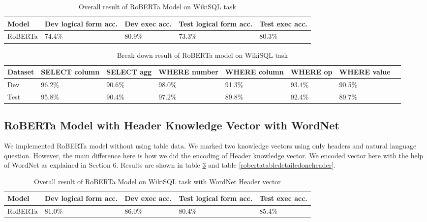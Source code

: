 \documentclass[12pt]{article}
\begin{document}
 \begin{table}
\centering
 \begin{tabular}{| m{2cm} | m{2cm}| m{2cm} |m{2cm}| m{2cm} |} 
 \hline
Model & Dev logical form acc. & Dev exec acc. & Test logical form acc. & Test exec acc. \\ 
 \hline\hline
  RoBERTa & 74.4\% & 80.9\% & 73.3\% & 80.3\% \\ 
 \hline
\end{tabular}
\caption{Overall result of RoBERTa Model on WikiSQL task}
\label{robertatable}
\end{table}


\begin{table}
\centering
 \begin{tabular}{| m{2cm} | m{2cm}| m{2cm} |m{2cm}| m{2cm} |m{2cm} | m{2cm} |m{2cm} |} 
 \hline
  Dataset & SELECT column & SELECT agg & WHERE number & WHERE column & WHERE op & WHERE value\\ 
 \hline\hline
  Dev & 96.2\% & 90.6\% & 98.0\% & 91.3\% & 93.4\% &  90.5\% \\ 
\hline
 Test & 95.8\% & 90.4\% & 97.2\% & 89.8\% & 92.4\% &  89.7\% \\ 
 \hline

\end{tabular}
\caption{Break down result of RoBERTa model on WikiSQL task}
\label{robertatabledetailed}
\end{table}

\subsection{RoBERTa Model with Header Knowledge Vector with WordNet}

We implemented RoBERTa model without using table data. We marked two knowledge vectors using only headers and natural language question. However, the main difference here is how we did the  encoding of Header knowledge vector. We encoded vector here with the help of WordNet as explained in Section 6. Results are shown in table \ref{robertatableoneheader} and table \ref{robertatabledetailedoneheader}.



 \begin{table}
\centering
 \begin{tabular}{| m{2cm} | m{2cm}| m{2cm} |m{2cm}| m{2cm} |} 
 \hline
Model & Dev logical form acc. & Dev exec acc. & Test logical form acc. & Test exec acc. \\ 
 \hline\hline
  RoBERTa & 81.0\% & 86.0\% & 80.4\% & 85.4\% \\ 
 \hline
\end{tabular}
\caption{Overall result of RoBERTa Model on WikiSQL task with WordNet Header vector}
\label{robertatableoneheader}
\end{table}
\end{document}
